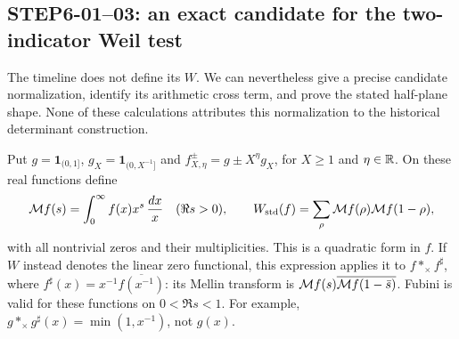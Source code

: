 \subsection{STEP6-01--03: an exact candidate for the two-indicator Weil test}
The timeline does not define its $W$. We can nevertheless give a precise candidate normalization, identify its arithmetic cross term, and prove the stated half-plane shape. None of these calculations attributes this normalization to the historical determinant construction.

Put $g=\mathbf1_{(0,1]}$, $g_X=\mathbf1_{(0,X^{-1}]}$ and $f^\pm_{X,\eta}=g\pm X^\eta g_X$, for $X\ge1$ and $\eta\in\mathbb R$. On these real functions define
\[
 \mathcal M f(s)=\int_0^\infty f(x)x^s\,\frac{dx}{x}\quad(\Re s>0),
 \qquad W_{\rm std}(f)=\sum_\rho\mathcal M f(\rho)\mathcal M f(1-\rho),
\]
with all nontrivial zeros and their multiplicities. This is a quadratic form in $f$. If $W$ instead denotes the linear zero functional, this expression applies it to $f*_\times f^\sharp$, where $f^\sharp(x)=x^{-1}\overline{f(x^{-1})}$: its Mellin transform is $\mathcal M f(s)\overline{\mathcal M f(1-\bar s)}$. Fubini is valid for these functions on $0<\Re s<1$. For example, $g*_\times g^\sharp(x)=\min(1,x^{-1})$, not $g(x)$.

